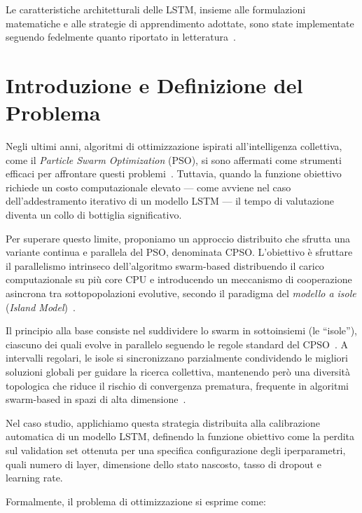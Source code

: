 \documentclass{article}
\begin{document}
Le caratteristiche architetturali delle LSTM, insieme alle formulazioni matematiche e alle strategie di apprendimento adottate, sono state implementate seguendo fedelmente quanto riportato in letteratura~\cite{hochreiter1997long, graves2013speech, greff2017lstm}.

\section{Introduzione e Definizione del Problema}

Negli ultimi anni, algoritmi di ottimizzazione ispirati all’intelligenza collettiva, come il \textit{Particle Swarm Optimization} (PSO), si sono affermati come strumenti efficaci per affrontare questi problemi~\cite{kennedy1995particle, eberhart2001pso}. Tuttavia, quando la funzione obiettivo richiede un costo computazionale elevato — come avviene nel caso dell’addestramento iterativo di un modello LSTM — il tempo di valutazione diventa un collo di bottiglia significativo.

Per superare questo limite, proponiamo un approccio distribuito che sfrutta una variante continua e parallela del PSO, denominata CPSO. L’obiettivo è sfruttare il parallelismo intrinseco dell’algoritmo swarm-based distribuendo il carico computazionale su più core CPU e introducendo un meccanismo di cooperazione asincrona tra sottopopolazioni evolutive, secondo il paradigma del \textit{modello a isole} (\textit{Island Model})~\cite{cantupaz1998survey, tomassini2005spatially}.

Il principio alla base consiste nel suddividere lo swarm in sottoinsiemi (le “isole”), ciascuno dei quali evolve in parallelo seguendo le regole standard del CPSO~\cite{professoressa}. A intervalli regolari, le isole si sincronizzano parzialmente condividendo le migliori soluzioni globali per guidare la ricerca collettiva, mantenendo però una diversità topologica che riduce il rischio di convergenza prematura, frequente in algoritmi swarm-based in spazi di alta dimensione~\cite{omran2005dynamic}.

Nel caso studio, applichiamo questa strategia distribuita alla calibrazione automatica di un modello LSTM, definendo la funzione obiettivo come la perdita sul validation set ottenuta per una specifica configurazione degli iperparametri, quali numero di layer, dimensione dello stato nascosto, tasso di dropout e learning rate.

Formalmente, il problema di ottimizzazione si esprime come:
\end{document}
